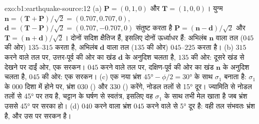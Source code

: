 \begin{solution}{exo:b1:earthquake-source:12}
(a) $\mathbf P = (0, 1, 0)$ और $\mathbf T = (1, 0, 0)$। युग्म
$\mathbf n = (\mathbf T + \mathbf P)/\sqrt2 = (0.707, 0.707, 0)$,
$\mathbf d = (\mathbf T - \mathbf P)/\sqrt2 = (0.707, -0.707, 0)$ संतुष्ट करता है
$\mathbf P = (\mathbf n - \mathbf d)/\sqrt2$ और $\mathbf T = (\mathbf n +
\mathbf d)/\sqrt2$। दोनों सदिश क्षैतिज हैं, इसलिए दोनों  ऊर्ध्वाधर हैं:
अभिलंब $\mathbf n$ वाला तल ($045$ की ओर) $135$--$315$  करता है,
अभिलंब $\mathbf d$ वाला तल ($135$ की ओर) $045$--$225$  करता है। (b) $315$  करने वाले तल पर, उत्तर-पूर्व की ओर का खंड $\mathbf d$ के अनुदिश चलता है,
$135$ की ओर: दूसरे खंड से देखने पर दाईं ओर, एक  सरकन। $045$  करने वाले तल पर, दक्षिण-पूर्व की ओर का खंड $\mathbf n$ के अनुदिश
चलता है, $045$ की ओर: एक  सरकन। (c) एक नया भ्रंश $\ang{45} - \phi/2 =
\ang{30}$ के साथ $\sigma_1$ बनाता है: $\sigma_1$ के $000$ दिशा में होने पर, भ्रंश $030$ () और $330$ ()  करेंगे, नोडल तलों से \ang{15} दूर।
 ज्यामिति से नोडल तलों से \ang{45} पर तय है, चट्टान के घर्षण से स्वतंत्र, इसलिए वह $\sigma_1$ के साथ तभी मेल खाता है जब भ्रंश उससे \ang{45} पर सरका हो। (d) $040$  करने वाला भ्रंश $045$  करने वाले  से \ang{5} दूर है: वही तल संभवतः भ्रंश है, और उस पर सरकन  है।
\end{solution}

